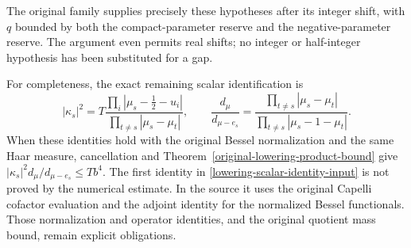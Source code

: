 The original family supplies precisely these hypotheses after its
integer shift, with $q$ bounded by both the compact-parameter reserve and the
negative-parameter reserve.  The argument even permits real shifts;
no integer or half-integer hypothesis has been substituted for a gap.

For completeness, the exact remaining scalar identification is
\begin{equation}\label{lowering-scalar-identity-input}
 |\kappa_s|^2
       =T\frac{\prod_i|\mu_s-\tfrac12-u_i|}
                    {\prod_{t\ne s}|\mu_s-\mu_t|},\qquad
 \frac{d_\mu}{d_{\mu-e_s}}
       =\frac{\prod_{t\ne s}|\mu_s-\mu_t|}
                    {\prod_{t\ne s}|\mu_s-1-\mu_t|}.
\end{equation}
When these identities hold with the original Bessel normalization and
the same Haar measure, cancellation and
Theorem~\ref{original-lowering-product-bound} give
$|\kappa_s|^2d_\mu/d_{\mu-e_s}\le Tb^4$.
The first identity in \eqref{lowering-scalar-identity-input} is not
proved by the numerical estimate.  In the source it uses the original
Capelli cofactor evaluation and the adjoint identity for the normalized
Bessel functionals.  Those normalization and operator identities,
and the original quotient mass bound, remain explicit obligations.
